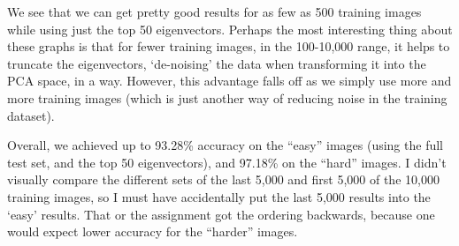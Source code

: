 \documentclass[11pt]{report}
\begin{document}
We see that we can get pretty good results for as few as 500 training images while using just the top 50 eigenvectors. Perhaps the most interesting thing about these graphs is that for fewer training images, in the 100-10,000 range, it helps to truncate the eigenvectors, `de-noising' the data when transforming it into the PCA space, in a way. However, this advantage falls off as we simply use more and more training images (which is just another way of reducing noise in the training dataset).

Overall, we achieved up to 93.28\% accuracy on the ``easy'' images (using the full test set, and the top 50 eigenvectors), and 97.18\% on the ``hard'' images. I didn't visually compare the different sets of the last 5,000 and first 5,000 of the 10,000 training images, so I must have accidentally put the last 5,000 results into the `easy' results. That or the assignment got the ordering backwards, because one would expect lower accuracy for the ``harder'' images.
\end{document}
